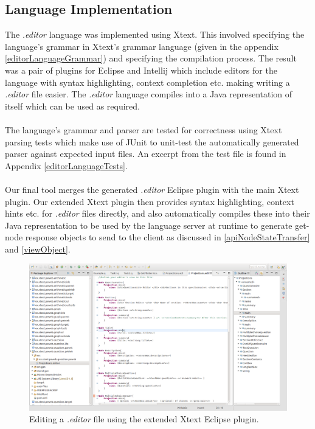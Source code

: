 \documentclass{article}
\begin{document}
{\subsection{Language Implementation}
The \emph{.editor} language was implemented using Xtext. This involved specifying the language's grammar in Xtext's grammar language (given in the appendix \ref{editorLanguageGrammar}) and specifying the compilation process. The result was a pair of plugins for Eclipse and Intellij which include editors for the language with syntax highlighting, context completion etc. making writing a \emph{.editor} file easier. The \emph{.editor} language compiles into a Java representation of itself which can be used as required.
\\
\\
The language's grammar and parser are tested for correctness using Xtext parsing tests which make use of JUnit to unit-test the automatically generated parser against expected input files. An excerpt from the test file is found in Appendix \ref{editorLanguageTests}.
\\
\\
Our final tool merges the generated \emph{.editor} Eclipse plugin with the main Xtext plugin. Our extended Xtext plugin then provides syntax highlighting, context hints etc. for \emph{.editor} files directly, and also automatically compiles these into their Java representation to be used by the language server at runtime to generate get-node response objects to send to the client as discussed in \ref{apiNodeStateTransfer} and \ref{viewObject}.

\begin{figure}[h!]
  \centering
  \includegraphics[width=\linewidth]{./Screenshots/EditorLanguagePluginScreenshot.png}
  \caption{Editing a \emph{.editor} file using the extended Xtext Eclipse plugin.}
  \label{fig:editorEditor}
\end{figure}

}
\end{document}
